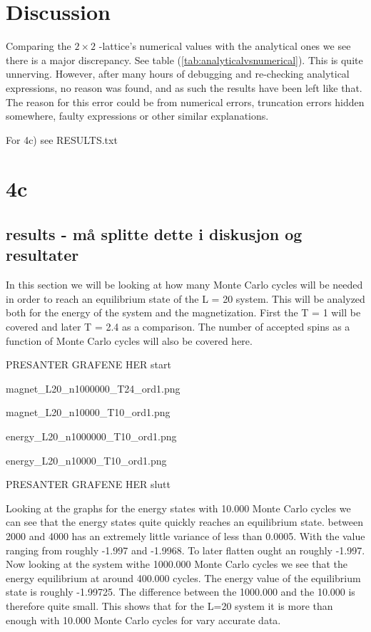 \documentclass{article}
\begin{document}
\vspace{1cm}

\clearpage
\newpage

\section{Discussion} \label{sec:Discussion}

Comparing the \texorpdfstring{ $2 \times 2$ }{text}-lattice's numerical values with the analytical ones we see there is a major discrepancy. See table (\ref{tab:analyticalvsnumerical}). This is quite unnerving. However, after many hours of debugging and re-checking analytical expressions, no reason was found, and as such the results have been left like that. The reason for this error could be from numerical errors, truncation errors hidden somewhere, faulty expressions or other similar explanations.

For 4c) see RESULTS.txt



\section{4c}
\subsection{results - må splitte dette i diskusjon og resultater}
In this section we will be looking at how many Monte Carlo cycles will be needed in order to reach an equilibrium state of the L = 20 system. This will be analyzed both for the energy of the system and the magnetization. First the T = 1 will be covered and later T = 2.4 as a comparison. The number of accepted spins as a function of Monte Carlo cycles will also be covered here.

PRESANTER GRAFENE HER start


magnet\_L20\_n1000000\_T24\_ord1.png

magnet\_L20\_n10000\_T10\_ord1.png

energy\_L20\_n1000000\_T10\_ord1.png

energy\_L20\_n10000\_T10\_ord1.png

PRESANTER GRAFENE HER slutt

Looking at the graphs for the energy states with 10.000 Monte Carlo cycles we can see that the energy states quite quickly reaches an equilibrium state. between 2000 and 4000 has an extremely little variance of less than 0.0005. With the value ranging from roughly -1.997 and -1.9968. To later flatten ought an roughly -1.997. Now looking at the system withe 1000.000 Monte Carlo cycles we see that the energy equilibrium at around 400.000 cycles. The energy value of the equilibrium state is roughly -1.99725. The difference between the 1000.000 and the 10.000 is therefore quite small. This shows that for the L=20 system it is more than enough with 10.000 Monte Carlo cycles for vary accurate data.
\end{document}
